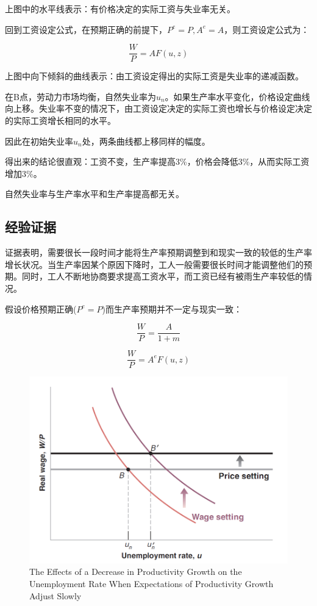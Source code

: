 \documentclass{article}
\begin{document}
上图中的水平线表示：有价格决定的实际工资与失业率无关。

回到工资设定公式，在预期正确的前提下，$ P^e=P,A^e=A $，则工资设定公式为：

\[
\frac{W}{P}=AF(u,z)
\]

上图中向下倾斜的曲线表示：由工资设定得出的实际工资是失业率的递减函数。

在B点，劳动力市场均衡，自然失业率为$ u_n $。如果生产率水平变化，价格设定曲线向上移。失业率不变的情况下，由工资设定决定的实际工资也增长与价格设定决定的实际工资增长相同的水平。

因此在初始失业率$ u_n $处，两条曲线都上移同样的幅度。

得出来的结论很直观：工资不变，生产率提高3\%，价格会降低3\%，从而实际工资增加3\%。

自然失业率与生产率水平和生产率提高都无关。

\subsection{经验证据}

证据表明，需要很长一段时间才能将生产率预期调整到和现实一致的较低的生产率增长状况。当生产率因某个原因下降时，工人一般需要很长时间才能调整他们的预期。同时，工人不断地协商要求提高工资水平，而工资已经有被雨生产率较低的情况。

假设价格预期正确($ P^e=P $)而生产率预期并不一定与现实一致：

\[
\frac{W}{P}=\frac{A}{1+m}
\]

\[
\frac{W}{P}=A^eF(u,z)
\]

\begin{figure}[H] %
	\centering %
	\includegraphics[width=1\textwidth]{13_3} %
	\caption{The Effects of a Decrease
		in Productivity Growth
		on the Unemployment
		Rate When Expectations
		of Productivity Growth
		Adjust Slowly} %
	\label{Fig.main4} %
\end{figure}
\end{document}
